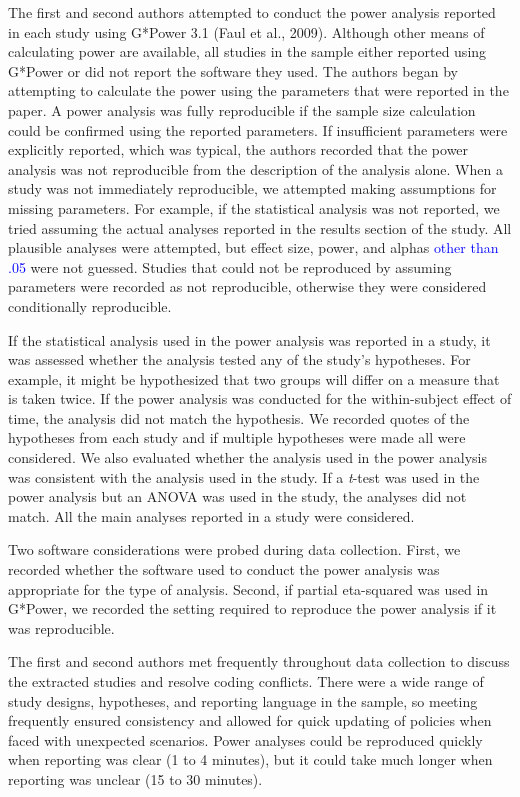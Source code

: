 \documentclass[
  man, donotrepeattitle,mask,floatsintext]{apa7}
\begin{document}
The first and second authors attempted to conduct the power analysis reported in each study using G*Power 3.1 (Faul et al., 2009). Although other means of calculating power are available, all studies in the sample either reported using G*Power or did not report the software they used. The authors began by attempting to calculate the power using the parameters that were reported in the paper. A power analysis was fully reproducible if the sample size calculation could be confirmed using the reported parameters. If insufficient parameters were explicitly reported, which was typical, the authors recorded that the power analysis was not reproducible from the description of the analysis alone. When a study was not immediately reproducible, we attempted making assumptions for missing parameters. For example, if the statistical analysis was not reported, we tried assuming the actual analyses reported in the results section of the study. All plausible analyses were attempted, but effect size, power, and alphas \textcolor{blue}{other than .05} were not guessed. Studies that could not be reproduced by assuming parameters were recorded as not reproducible, otherwise they were considered conditionally reproducible.

If the statistical analysis used in the power analysis was reported in a study, it was assessed whether the analysis tested any of the study's hypotheses. For example, it might be hypothesized that two groups will differ on a measure that is taken twice. If the power analysis was conducted for the within-subject effect of time, the analysis did not match the hypothesis. We recorded quotes of the hypotheses from each study and if multiple hypotheses were made all were considered. We also evaluated whether the analysis used in the power analysis was consistent with the analysis used in the study. If a \emph{t}-test was used in the power analysis but an ANOVA was used in the study, the analyses did not match. All the main analyses reported in a study were considered.

Two software considerations were probed during data collection. First, we recorded whether the software used to conduct the power analysis was appropriate for the type of analysis. Second, if partial eta-squared was used in G*Power, we recorded the setting required to reproduce the power analysis if it was reproducible.

The first and second authors met frequently throughout data collection to discuss the extracted studies and resolve coding conflicts. There were a wide range of study designs, hypotheses, and reporting language in the sample, so meeting frequently ensured consistency and allowed for quick updating of policies when faced with unexpected scenarios. Power analyses could be reproduced quickly when reporting was clear (1 to 4 minutes), but it could take much longer when reporting was unclear (15 to 30 minutes).
\end{document}
